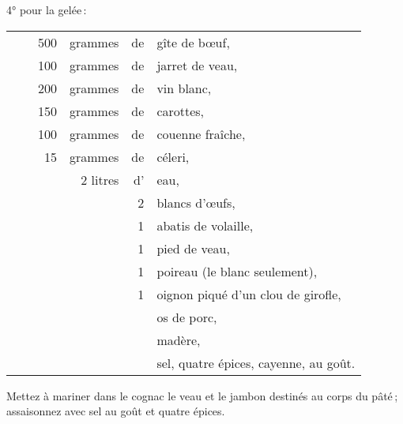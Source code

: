 4° pour la gelée :

\footnotesize
\begin{longtable}{rp{2em}rrrp{16em}}
& & 500 &  grammes & de & gîte de bœuf,                                                                   \\
& & 100 &  grammes & de & jarret de veau,                                                                 \\
& & 200 &  grammes & de & vin blanc,                                                                      \\
& & 150 &  grammes & de & carottes,                                                                       \\
& & 100 &  grammes & de & couenne fraîche,                                                                \\
& &  15 &  grammes & de & céleri,                                                                         \\
& &     & 2 litres & d' & eau,                                                                            \\
& &     &          &  2 & blancs d'œufs,                                                                  \\
& &     &          &  1 & abatis de volaille,                                                             \\
& &     &          &  1 & pied de veau,                                                                   \\
& &     &          &  1 & poireau (le blanc seulement),                                                   \\
& &     &          &  1 & oignon piqué d'un clou de girofle,                                              \\
& &     &          &    & os de porc,                                                                     \\
& &     &          &    & madère,                                                                         \\
& &     &          &    & sel, quatre épices, cayenne, au goût.                                           \\
\end{longtable}
\normalsize

Mettez à mariner dans le cognac le veau et le jambon destinés au corps du pâté ;
assaisonnez avec sel au goût et quatre épices.

